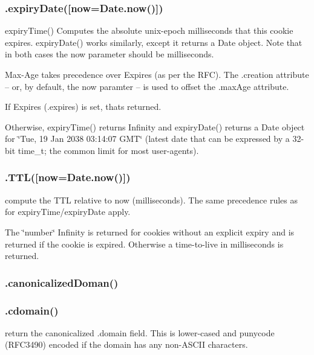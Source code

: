 \subsubsection*{{\ttfamily .expiry\+Date(\mbox{[}now=Date.\+now()\mbox{]})}}

expiry\+Time() Computes the absolute unix-\/epoch milliseconds that this cookie expires. expiry\+Date() works similarly, except it returns a {\ttfamily Date} object. Note that in both cases the {\ttfamily now} parameter should be milliseconds.

Max-\/\+Age takes precedence over Expires (as per the R\+FC). The {\ttfamily .creation} attribute -- or, by default, the {\ttfamily now} paramter -- is used to offset the {\ttfamily .max\+Age} attribute.

If Expires ({\ttfamily .expires}) is set, that\textquotesingle{}s returned.

Otherwise, {\ttfamily expiry\+Time()} returns {\ttfamily Infinity} and {\ttfamily expiry\+Date()} returns a {\ttfamily Date} object for \char`\"{}\+Tue, 19 Jan 2038 03\+:14\+:07 G\+M\+T\char`\"{} (latest date that can be expressed by a 32-\/bit {\ttfamily time\+\_\+t}; the common limit for most user-\/agents).

\subsubsection*{{\ttfamily .T\+TL(\mbox{[}now=Date.\+now()\mbox{]})}}

compute the T\+TL relative to {\ttfamily now} (milliseconds). The same precedence rules as for {\ttfamily expiry\+Time}/{\ttfamily expiry\+Date} apply.

The \char`\"{}number\char`\"{} {\ttfamily Infinity} is returned for cookies without an explicit expiry and {} is returned if the cookie is expired. Otherwise a time-\/to-\/live in milliseconds is returned.

\subsubsection*{{\ttfamily .canonicalized\+Doman()}}

\subsubsection*{{\ttfamily .cdomain()}}

return the canonicalized {\ttfamily .domain} field. This is lower-\/cased and punycode (R\+F\+C3490) encoded if the domain has any non-\/\+A\+S\+C\+II characters.

